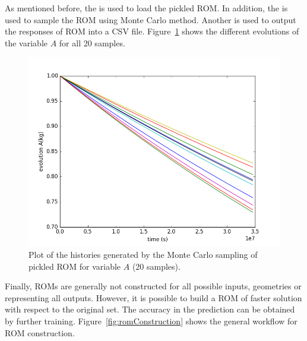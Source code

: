 As mentioned before, the  is used to load the pickled ROM. In addition, the  is
used to sample the ROM using Monte Carlo method. Another  is used to output the responses of ROM
into a CSV file. Figure~\ref{fig:historiesROMPlotLine_A} shows the different evolutions of the variable $A$ for
all 20 samples.

\begin{figure}[h!]
  \centering
  \includegraphics[scale=0.7]{../../tests/framework/user_guide/ravenTutorial/gold/ROMLoad/1-historyROMPlot_line.png}
  \caption{Plot of the histories generated by the Monte Carlo sampling of pickled ROM for variable $A$ (20 samples).}
  \label{fig:historiesROMPlotLine_A}
\end{figure}

Finally, ROMs are generally not constructed for all possible inputs, geometries or representing all outputs. However,
it is possible to build a ROM of faster solution with respect to the original set. The accuracy in the prediction
can be obtained by further training. Figure~\ref{fig:romConstruction} shows the general workflow for ROM construction.

